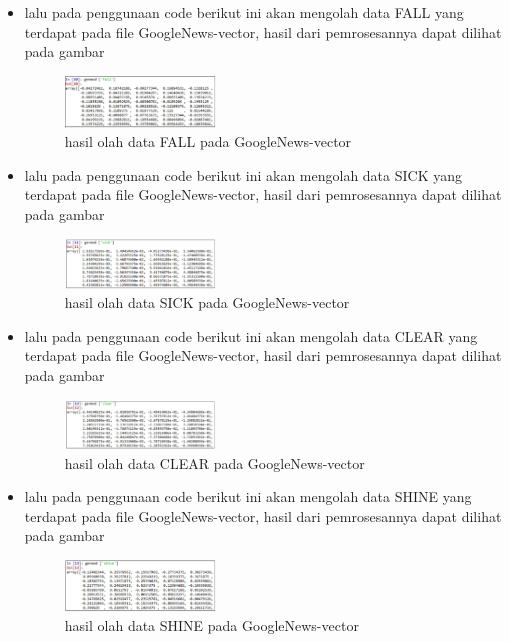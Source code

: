\begin{enumerate}
\begin{itemize}
        \item  lalu pada penggunaan code berikut ini akan mengolah data FALL yang terdapat pada file GoogleNews-vector, hasil dari pemrosesannya dapat dilihat pada gambar
        \begin{figure}[H]
            \includegraphics[width=4cm]{figures/1174040/chapter5/4.png}
            \centering
            \caption{hasil olah data FALL pada GoogleNews-vector}
        \end{figure}
        
        \item  lalu pada penggunaan code berikut ini akan mengolah data SICK yang terdapat pada file GoogleNews-vector, hasil dari pemrosesannya dapat dilihat pada gambar
        \begin{figure}[H]
            \includegraphics[width=4cm]{figures/1174040/chapter5/5.png}
            \centering
            \caption{hasil olah data SICK pada GoogleNews-vector}
        \end{figure}
        
        \item  lalu pada penggunaan code berikut ini akan mengolah data CLEAR yang terdapat pada file GoogleNews-vector, hasil dari pemrosesannya dapat dilihat pada gambar
        \begin{figure}[H]
            \includegraphics[width=4cm]{figures/1174040/chapter5/6.png}
            \centering
            \caption{hasil olah data CLEAR pada GoogleNews-vector}
        \end{figure}
        
        \item  lalu pada penggunaan code berikut ini akan mengolah data SHINE yang terdapat pada file GoogleNews-vector, hasil dari pemrosesannya dapat dilihat pada gambar
        \begin{figure}[H]
            \includegraphics[width=4cm]{figures/1174040/chapter5/7.png}
            \centering
            \caption{hasil olah data SHINE pada GoogleNews-vector}
        \end{figure}
        

\end{itemize}
\end{enumerate}
